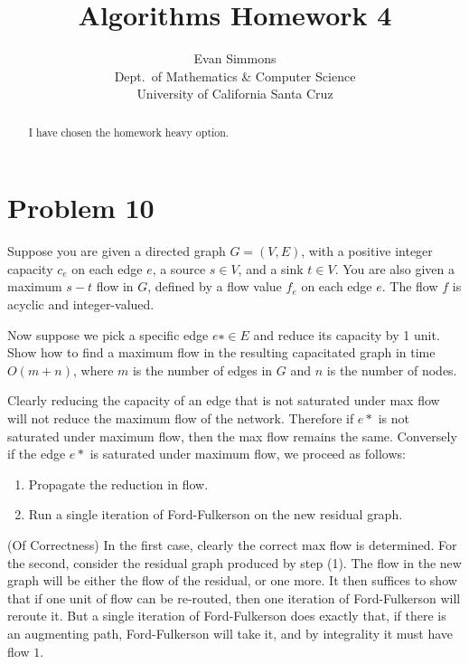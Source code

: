 \documentclass{amsart}
\theoremstyle{definition}
\theoremstyle{remark}
\numberwithin{equation}{section}
\begin{document}
\title[]{Algorithms Homework 4}%
\author{Evan Simmons \\
        Dept.\ of Mathematics \& Computer Science \\ University of California Santa Cruz}%
\renewcommand{\abstractname}{Homework Option}
\begin{abstract}
I have chosen the homework heavy option.
\end{abstract}
\maketitle
\section{Problem 10}
Suppose you are given a directed graph $G=(V,E)$, with a positive integer capacity $c_e$ on each edge $e$, a source $s \in V$, and a sink $t\in V$. You are also given a maximum $s-t$ flow in $G$, defined by a flow value $f_e$ on each edge $e$. The flow $f$ is acyclic and integer-valued.

Now suppose we pick a specific edge $e∗ \in E$ and reduce its capacity by 1 unit. Show how to find a maximum flow in the resulting capacitated graph in time $O(m + n)$, where $m$ is the number of edges in $G$ and $n$ is the number of nodes.

\algstar
Clearly reducing the capacity of an edge that is not saturated under max flow will not reduce the maximum flow of the network. Therefore if $e*$ is not saturated under maximum flow, then the max flow remains the same. Conversely if the edge $e*$ is saturated under maximum flow, we proceed as follows:

\begin{enumerate}
  \item Propagate the reduction in flow.
  \item Run a single iteration of Ford-Fulkerson on the new residual graph.
\end{enumerate}

\proof (Of Correctness)
In the first case, clearly the correct max flow is determined. For the second, consider the residual graph produced by step (1). The flow in the new graph will be either the flow of the residual, or one more. It then suffices to show that if one unit of flow can be re-routed, then one iteration of Ford-Fulkerson will reroute it. But a single iteration of Ford-Fulkerson does exactly that, if there is an augmenting path, Ford-Fulkerson will take it, and by integrality it must have flow $1$.
\end{document}
